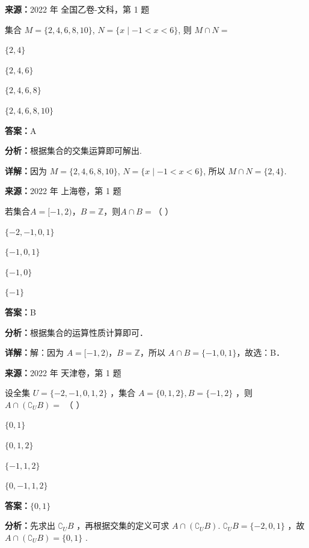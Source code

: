 \begin{question}[points=5]
\textbf{来源：}2022 年 全国乙卷-文科，第 1 题\par
集合 $M = \{2, 4, 6, 8, 10\}$, $N = \{ x \mid -1 < x < 6 \}$, 则 $M \cap N =$
\begin{choices}
  \item $\{2, 4\}$
  \item $\{2, 4, 6\}$
  \item $\{2, 4, 6, 8\}$
  \item $\{2, 4, 6, 8, 10\}$
\end{choices}
\begin{solution}
\textbf{答案：}A

\textbf{分析：}根据集合的交集运算即可解出.

\textbf{详解：}因为 $M = \{2, 4, 6, 8, 10\}$, $N = \{ x \mid -1 < x < 6 \}$, 所以 $M \cap N = \{2, 4\}$.
\end{solution}
\end{question}

\begin{question}[points=5]
\textbf{来源：}2022 年 上海卷，第 1 题\par
若集合$A=[-1,2)$，$B=\mathbb{Z}$，则$A\cap B=$（ ）
\begin{choices}
  \item $\{-2,-1,0,1\}$
  \item $\{-1,0,1\}$
  \item $\{-1,0\}$
  \item $\{-1\}$
\end{choices}
\begin{solution}
\textbf{答案：}B

\textbf{分析：}根据集合的运算性质计算即可．

\textbf{详解：}解：因为 $A=[-1,2)$，$B=\mathbb{Z}$，所以 $A\cap B=\{-1,0,1\}$，故选：B．
\end{solution}
\end{question}

\begin{question}[points=5]
\textbf{来源：}2022 年 天津卷，第 1 题\par
设全集 $U = \{-2, -1, 0,1, 2\}$ ，集合 $A = \{0,1, 2\}, B = \{-1, 2\}$ ，则 $A \cap (\complement_U B) =$ （   ）
\begin{choices}
  \item $\{0,1\}$
  \item $\{0,1, 2\}$
  \item $\{-1,1, 2\}$
  \item $\{0, -1,1, 2\}$
\end{choices}
\begin{solution}
\textbf{答案：}$\{0,1\}$

\textbf{分析：}先求出 $\complement_U B$ ，再根据交集的定义可求 $A \cap (\complement_U B)$. $\complement_U B = \{-2, 0,1\}$ ，故 $A \cap (\complement_U B) = \{0,1\}$ .
\end{solution}
\end{question}

